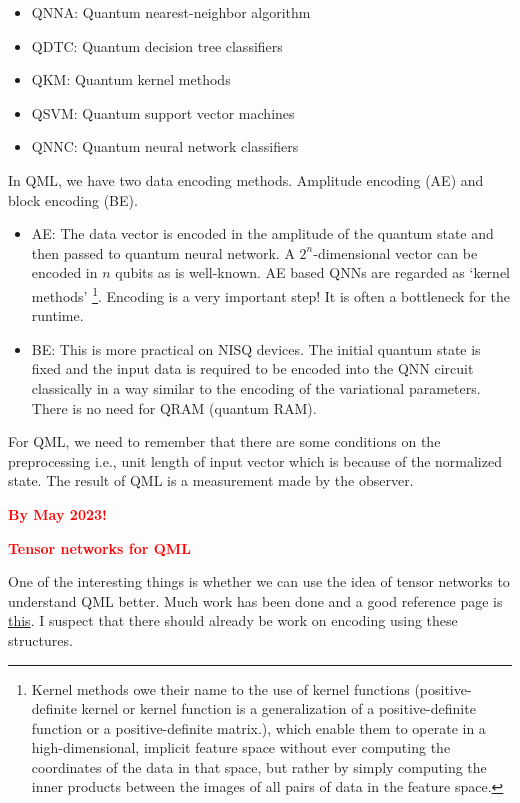 \documentclass[11pt]{article}
\newcommand{\TODO}[1]{\textcolor{red}{\textbf{#1}}}
\begin{document}
\begin{itemize}
\item QNNA: Quantum nearest-neighbor algorithm 
\item QDTC: Quantum decision tree classifiers
\item QKM: Quantum kernel methods
\item QSVM: Quantum support vector machines
\item QNNC: Quantum neural network classifiers
\end{itemize}

In QML, we have two data encoding methods. Amplitude encoding (AE) and block encoding (BE). 

\begin{itemize}
\item AE: The data vector is encoded in the amplitude of the quantum state and then passed to quantum neural network. 
A $2^{n}$-dimensional vector can be encoded in $n$ qubits as is well-known. AE based QNNs are regarded as 
`kernel methods' \footnote{Kernel methods owe their name to the use of kernel functions (positive-definite kernel or kernel function is a generalization of a positive-definite function or a positive-definite matrix.), 
which enable them to operate in a high-dimensional, implicit feature space without ever computing the coordinates of the data in that space, but rather by simply computing the inner products between the images of all pairs of data in the feature space.}. Encoding is a very important step! It is often a bottleneck for the runtime. 
\item BE: This is more practical on NISQ devices. The initial quantum state is fixed and 
the input data is required to be encoded into the QNN circuit classically in a way similar to the encoding of the variational parameters.
There is no need for QRAM (quantum RAM). 
\end{itemize}

For QML, we need to remember that there are some conditions on the 
preprocessing i.e., unit length of input vector which is because of the normalized state. 
The result of QML is a measurement made by the observer. 



\TODO{By May 2023!} 

\TODO{Tensor networks for QML}

One of the interesting things is whether we can use the idea of tensor networks 
to understand QML better. Much work has been done and a good reference page is 
\href{https://tensornetwork.org/ml/}{this}. I suspect that there should already be work on encoding using these structures. 
\end{document}

